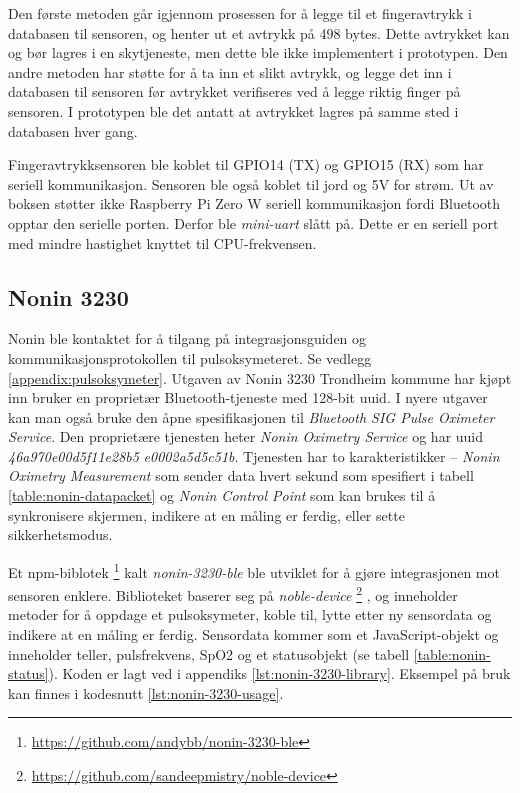 Den første metoden går igjennom prosessen for å legge til et fingeravtrykk i databasen til sensoren, og henter ut et avtrykk
på 498 bytes. Dette avtrykket kan og bør lagres i en skytjeneste, men dette ble ikke implementert i prototypen.
Den andre metoden har støtte for å ta inn et slikt avtrykk, og legge det inn i databasen til sensoren før avtrykket
verifiseres ved å legge riktig finger på sensoren. I prototypen ble det antatt at avtrykket lagres på samme sted i databasen hver gang.

Fingeravtrykksensoren ble koblet til GPIO14 (TX) og GPIO15 (RX) som har seriell kommunikasjon. Sensoren ble også koblet til jord
og 5V for strøm. Ut av boksen støtter ikke Raspberry Pi Zero W seriell kommunikasjon fordi Bluetooth opptar den serielle porten.
Derfor ble \textit{mini-uart} slått på. Dette er en seriell port med mindre hastighet knyttet til CPU-frekvensen.

\subsection{Nonin 3230}
Nonin ble kontaktet for å tilgang på integrasjonsguiden og kommunikasjonsprotokollen til pulsoksymeteret.
Se vedlegg \ref{appendix:pulsoksymeter}.
Utgaven av Nonin 3230 Trondheim kommune har kjøpt inn bruker en proprietær Bluetooth-tjeneste med 128-bit \gls{uuid}.
I nyere utgaver kan man også bruke den åpne spesifikasjonen til \textit{Bluetooth SIG Pulse Oximeter Service}.
Den proprietære tjenesten heter \textit{Nonin Oximetry Service} og har \gls{uuid} \textit{46a970e00d5f11e28b5}\newline
\textit{e0002a5d5c51b}.
Tjenesten har to karakteristikker -- \textit{Nonin Oximetry Measurement} som sender data hvert sekund som spesifiert
i tabell \ref{table:nonin-datapacket} og \textit{Nonin Control Point} som kan brukes til å synkronisere skjermen,
indikere at en måling er ferdig, eller sette sikkerhetsmodus. 

Et \gls{npm}-biblotek \footnote{\url{https://github.com/andybb/nonin-3230-ble}} kalt \textit{nonin-3230-ble} ble utviklet
for å gjøre integrasjonen mot sensoren enklere.
Biblioteket baserer seg på \textit{noble-device} \footnote{\url{https://github.com/sandeepmistry/noble-device}}
, og inneholder metoder for å oppdage et pulsoksymeter,
koble til, lytte etter ny sensordata og indikere at en måling er ferdig. Sensordata kommer som et JavaScript-objekt
og inneholder teller, pulsfrekvens, SpO2 og et statusobjekt (se tabell \ref{table:nonin-status}).
Koden er lagt ved i appendiks \ref{lst:nonin-3230-library}.
Eksempel på bruk kan finnes i kodesnutt \ref{lst:nonin-3230-usage}.

